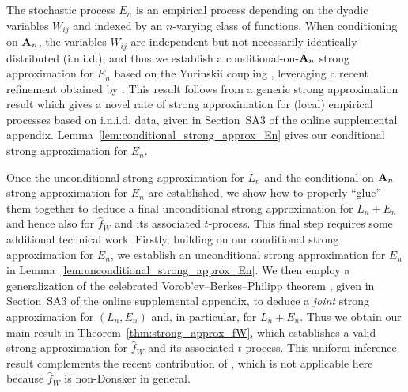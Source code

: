 The stochastic process $E_n$ is an empirical process depending on the dyadic
variables $W_{i j}$ and indexed by an $n$-varying class of functions.
When conditioning on $\mathbf{A}_n$, the variables $W_{i j}$ are independent but not
necessarily identically distributed (i.n.i.d.), and thus we establish a
conditional-on-$\mathbf{A}_n$ strong
approximation for $E_n$ based on the Yurinskii coupling
\citep{yurinskii1978error}, leveraging a recent refinement obtained by
\citet*[Lemma~38]{belloni2019conditional}.
This result follows from a generic
strong approximation result which
gives a novel rate of strong approximation for
(local) empirical processes based on i.n.i.d. data,
given in
Section~SA3 of
the online supplemental appendix.
Lemma~\ref{lem:conditional_strong_approx_En}
gives our conditional strong approximation for $E_n$.

Once the unconditional strong approximation for $L_n$ and the
conditional-on-$\mathbf{A}_n$ strong approximation for $E_n$ are established,
we show how to properly ``glue'' them together to deduce a final unconditional
strong approximation for $L_n+E_n$ and hence also for $\hat{f}_W$ and its
associated $t$-process. This final step requires some additional technical work.
Firstly, building on our conditional strong approximation for $E_n$, we
establish an unconditional strong approximation for $E_n$ in
Lemma~\ref{lem:unconditional_strong_approx_En}. We then employ a
generalization of the celebrated Vorob'ev--Berkes--Philipp theorem
\citep{dudley1999uniform}, given in
Section~SA3 of
the online supplemental appendix,
to deduce a \emph{joint} strong
approximation for $(L_n,E_n)$ and, in particular, for $L_n+E_n$.
Thus we obtain our main result in Theorem~\ref{thm:strong_approx_fW},
which establishes a valid strong approximation for $\hat{f}_W$
and its associated $t$-process.
This uniform inference result complements the recent contribution of
\citet{davezies2021exchangeable}, which is not applicable
here because $\hat{f}_W$ is non-Donsker in general.

